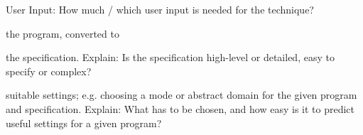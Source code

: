 \documentclass[a4paper]{article}
\begin{document}
\begin{minipage}[t]{0.16\linewidth}
\begin{betterlist}
\begin{betterlist}
		\end{betterlist}
		\item \alert{User Input:} How much / which user input is needed for the technique?
		\begin{betterlist}
			\item \checkboxChecked the program, converted to

			\item \checkboxHalfChecked the specification. Explain: Is the specification high-level or detailed, easy to specify or complex?

			\item \checkboxUnchecked suitable settings; e.g. choosing a mode or abstract domain for the given program and specification. Explain: What has to be chosen, and how easy is it to predict useful settings for a given program?


\end{betterlist}
\end{betterlist}
\end{minipage}
\end{document}

